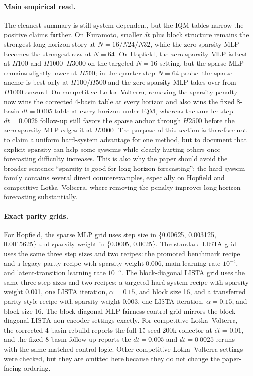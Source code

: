 \paragraph{Main empirical read.}
The cleanest summary is still system-dependent, but the IQM tables narrow the
positive claims further. On Kuramoto, smaller $dt$ plus block structure remains
the strongest long-horizon story at $N=16/N24/N32$, while the zero-sparsity
MLP becomes the strongest row at $N=64$. On Hopfield, the zero-sparsity MLP is
best at $H100$ and $H1000$--$H3000$ on the targeted $N=16$ setting, but the
sparse MLP remains slightly lower at $H500$; in the quarter-step $N=64$ probe,
the sparse anchor is best only at $H100/H500$ and the zero-sparsity MLP takes
over from $H1000$ onward. On competitive Lotka--Volterra, removing the
sparsity penalty now wins the corrected 4-basin table at every horizon and
also wins the fixed 8-basin $dt=0.005$ table at every horizon under IQM,
whereas the smaller-step $dt=0.0025$ follow-up still favors the sparse anchor
through $H2500$ before the zero-sparsity MLP edges it at $H3000$. The purpose
of this section is therefore not to claim a uniform hard-system advantage for
one method, but to document that explicit sparsity can help some systems while
clearly hurting others once forecasting difficulty increases. This is also why
the paper should avoid the broader sentence ``sparsity is good for
long-horizon forecasting'': the hard-system family contains several direct
counterexamples, especially on Hopfield and competitive Lotka--Volterra, where
removing the penalty improves long-horizon forecasting substantially.

\paragraph{Exact parity grids.}
For Hopfield, the sparse MLP grid uses step size in
\{0.00625, 0.003125, 0.0015625\} and sparsity weight in \{0.0005, 0.0025\}. The
standard LISTA grid uses the same three step sizes and two recipes: the promoted benchmark recipe and a legacy parity recipe with sparsity weight 0.006,
main learning rate $10^{-4}$, and latent-transition learning rate $10^{-5}$.
The block-diagonal LISTA grid uses the same three step sizes and two recipes: a
targeted hard-system recipe with sparsity weight 0.001, one LISTA iteration,
$\alpha = 0.15$, and block size 16, and a transferred parity-style recipe with
sparsity weight 0.003, one LISTA iteration, $\alpha = 0.15$, and block size 16.
The block-diagonal MLP fairness-control grid mirrors the block-diagonal LISTA
non-encoder settings exactly. For competitive Lotka--Volterra, the corrected
4-basin rebuild reports the full 15-seed 200k collector at $dt=0.01$, and the
fixed 8-basin follow-up reports the $dt=0.005$ and $dt=0.0025$ reruns with the
same matched control logic. Other competitive Lotka--Volterra settings were
checked, but they are omitted here because they do not change the paper-facing
ordering.

